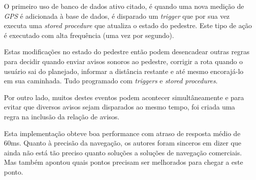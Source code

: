 \documentclass[conference]{IEEEtran}
\begin{document}
    O primeiro uso de banco de dados ativo citado, é quando uma nova medição de \textit{GPS} é adicionada à base de dados, é disparado um \textit{trigger} que por sua vez executa uma \textit{stored procedure} que atualiza o estado do pedestre. Este tipo de ação é executado com alta frequência (uma vez por segundo).

    Estas modificações no estado do pedestre então podem desencadear outras regras para decidir quando enviar avisos sonoros ao pedestre, corrigir a rota quando o usuário sai do planejado, informar a distância restante e até mesmo encorajá-lo em sua caminhada. Tudo programado com \textit{triggers} e \textit{stored procedures}.

    Por outro lado, muitos destes eventos podem acontecer simultâneamente e para evitar que diversos avisos sejam disparados ao mesmo tempo, foi criada uma regra na inclusão da relação de avisos.

    Esta implementação obteve boa performance com atraso de resposta médio de 60ms. Quanto à precisão da navegação, os autores foram sinceros em dizer que ainda não está tão preciso quanto soluções a soluções de navegação comerciais. Mas também apontou quais pontos precisam ser melhorados para chegar a este ponto.
\end{document}
